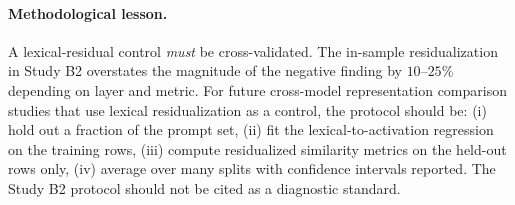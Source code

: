 \paragraph{Methodological lesson.} A lexical-residual control
\emph{must} be cross-validated. The in-sample residualization in
Study B2 overstates the magnitude of the negative finding by
$10$--$25\%$ depending on layer and metric. For future cross-model
representation comparison studies that use lexical residualization
as a control, the protocol should be: (i) hold out a fraction of
the prompt set, (ii) fit the lexical-to-activation regression on the
training rows, (iii) compute residualized similarity metrics on the
held-out rows only, (iv) average over many splits with confidence
intervals reported. The Study B2 protocol should not be cited as a
diagnostic standard.
